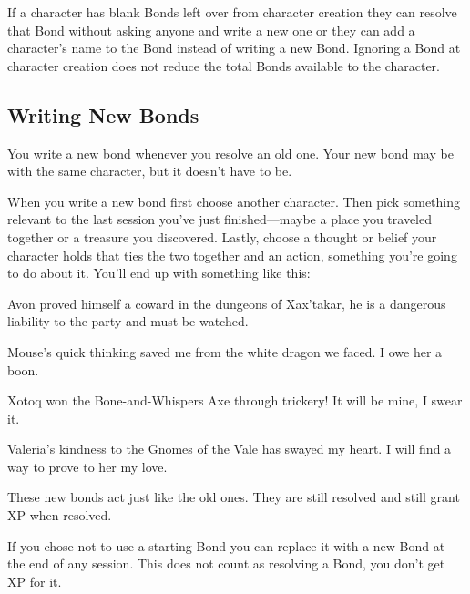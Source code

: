        

If a character has blank Bonds left over from character creation they can resolve that Bond without asking anyone and write a new one or they can add a character's name to the Bond instead of writing a new Bond. Ignoring a Bond at character creation does not reduce the total Bonds available to the character.

       
\subsection{Writing New Bonds}   
       

You write a new bond whenever you resolve an old one. Your new bond may be with the same character, but it doesn't have to be.

       

When you write a new bond first choose another character. Then pick something relevant to the last session you've just finished—maybe a place you traveled together or a treasure you discovered. Lastly, choose a thought or belief your character holds that ties the two together and an action, something you're going to do about it. You'll end up with something like this:

       
\startitemize[1,packed]
         
\item Avon proved himself a coward in the dungeons of Xax'takar, he is a dangerous liability to the party and must be watched.

         
\item Mouse's quick thinking saved me from the white dragon we faced. I owe her a boon.

         
\item Xotoq won the Bone-and-Whispers Axe through trickery! It will be mine, I swear it.

         
\item Valeria's kindness to the Gnomes of the Vale has swayed my heart. I will find a way to prove to her my love.

       
\stopitemize
       

These new bonds act just like the old ones. They are still resolved and still grant XP when resolved.

       

If you chose not to use a starting Bond you can replace it with a new Bond at the end of any session. This does not count as resolving a Bond, you don't get XP for it.

